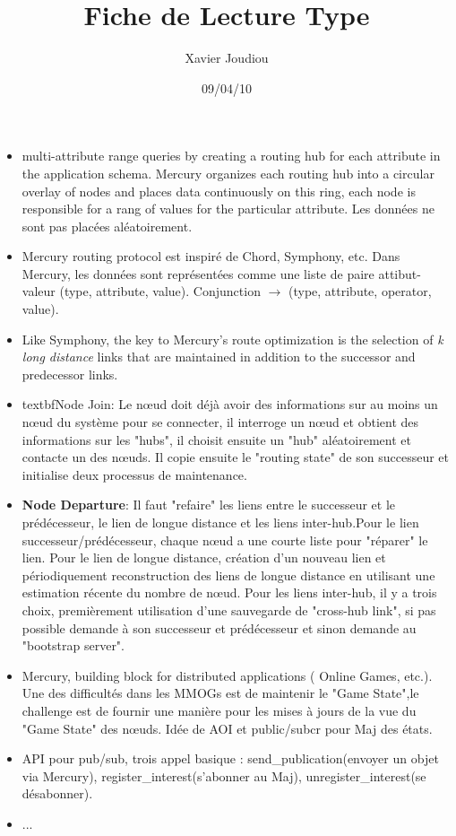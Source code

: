 \documentclass[11pt,a4paper]{article}
\title{Fiche de Lecture Type}
\author{Xavier Joudiou}
\date{09/04/10}
\begin{document}
	
  \begin{itemize}
  \renewcommand{\labelitemi}{$\Rightarrow$}
	\item multi-attribute range queries by creating a routing hub for each attribute in the application schema. Mercury organizes each routing hub into a circular overlay of nodes and places data continuously on this ring, each node is responsible for a rang of values for the particular attribute. Les données ne sont pas placées aléatoirement. 
	\item Mercury routing protocol est inspiré de Chord, Symphony, etc. Dans Mercury, les données sont représentées comme une liste de paire attibut-valeur (type, attribute, value). Conjunction $\rightarrow$ (type, attribute, operator, value). 
	\item Like Symphony, the key to Mercury's route optimization is the selection of \textit{k long distance} links that are maintained in addition to the successor and predecessor links.	
	\item textbf{Node Join}: Le nœud doit déjà avoir des informations sur au moins un nœud du système pour se connecter, il interroge un nœud et obtient des informations sur les "hubs", il choisit ensuite un "hub" aléatoirement et contacte un des nœuds. Il copie ensuite le "routing state" de son successeur et initialise deux processus de maintenance.
	\item \textbf{Node Departure}: Il faut "refaire" les liens entre le successeur et le prédécesseur, le lien de longue distance et les liens inter-hub.Pour le lien successeur/prédécesseur, chaque nœud a une courte liste pour "réparer" le lien. Pour le lien de longue distance, création d'un nouveau lien et périodiquement reconstruction des liens de longue distance en utilisant une estimation récente du nombre de nœud. Pour les liens inter-hub, il y a trois choix, premièrement utilisation d'une sauvegarde de "cross-hub link", si pas possible demande à son successeur et prédécesseur et sinon demande au "bootstrap server".
	\item Mercury, building block for distributed applications ( Online Games, etc.). Une des difficultés dans les MMOGs est de maintenir le "Game State",le challenge est de fournir une manière pour les mises à jours de la vue du "Game State" des nœuds. Idée de AOI et public/subcr pour Maj des états.
	\item API pour pub/sub, trois appel basique : send\_publication(envoyer un objet via Mercury), register\_interest(s'abonner au Maj), unregister\_interest(se désabonner).
	\item ...
  \end{itemize}
\end{document}
